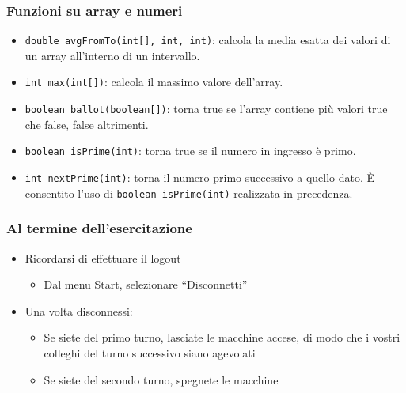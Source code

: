 \documentclass{beamer}
\begin{document}
\begin{frame}[fragile]
\frametitle{Funzioni su array e numeri}
\begin{itemize}
 \item \texttt{double avgFromTo(int[], int, int)}: calcola la media esatta dei valori di un array all'interno di un intervallo.
 \item \texttt{int max(int[])}: calcola il massimo valore dell'array.
 \item \texttt{boolean ballot(boolean[])}: torna true se l'array contiene più valori true che false, false altrimenti.
 \item \texttt{boolean isPrime(int)}: torna true se il numero in ingresso è primo.
 \item \texttt{int nextPrime(int)}: torna il numero primo successivo a quello dato. È consentito l'uso di \texttt{boolean isPrime(int)} realizzata in precedenza.
\end{itemize}
\end{frame}

\begin{frame}
\frametitle{Al termine dell'esercitazione}
\begin{itemize}
 \item Ricordarsi di effettuare il logout
  \begin{itemize}
    \item Dal menu Start, selezionare ``Disconnetti''
  \end{itemize}
 \item Una volta disconnessi:
  \begin{itemize}
    \item Se siete del primo turno, lasciate le macchine accese, di modo che i vostri colleghi del turno successivo siano agevolati
    \item Se siete del secondo turno, spegnete le macchine
  \end{itemize}
\end{itemize}
\end{frame}
\end{document}

